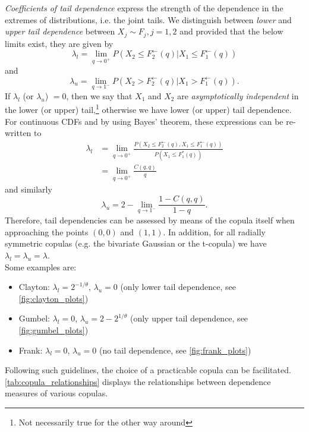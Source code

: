 
\textit{Coefficients of tail dependence} express the strength of the dependence in the extremes of distributions, i.e. the joint tails. We distinguish between \textit{lower} and \textit{upper tail dependence} between $X_j \sim F_j, j = 1,2$ and provided that the below limits exist, they are given by
\begin{equation}
\lambda_{l}=\lim \limits _ {q \rightarrow 0^+} P \left(X_{2} \leq F_{2}^{\leftarrow}(q) | X_{1} \leq F_{1}^{\leftarrow}(q)\right) 
\label{eq:lower_tail_dependence}
\end{equation}
and 
\begin{equation}
\lambda_{u}=\lim \limits _ {q \rightarrow 1^-} P \left(X_{2} > F_{2}^{\leftarrow}(q) | X_{1} > F_{1}^{\leftarrow}(q)\right).
\label{eq:upper_tail_dependence}
\end{equation}
If $\lambda_l$ (or $\lambda_u$) $=0$, then we say that $X_1$ and $X_2$ are \textit{asymptotically independent} in the lower (or upper) tail,\footnote{Not necessarily true for the other way around} otherwise we have lower (or upper) tail dependence.\\
For continuous \acp{CDF} and by using Bayes' theorem, these expressions can be re-written to
$$
\begin{aligned}
\lambda_{l} &=\lim _{q \rightarrow 0^+} \frac{P\left(X_{2} \leq F_{2}^{\leftarrow}(q), X_{1} \leq F_{1}^{\leftarrow}(q)\right)}{P\left(X_{1} \leq F_{1}^{*}(q)\right)} \\
&=\lim _{q \rightarrow 0^+} \frac{C(q, q)}{q}
\end{aligned}
$$
and similarly
$$
\lambda_u = 2-\lim _{q \rightarrow 1^-} \frac{1-C(q, q)}{1-q}.
$$
Therefore, tail dependencies can be assessed by means of the copula itself when approaching the points $(0,0)$ and $(1,1)$. In addition, for all radially symmetric copulas (e.g. the bivariate Gaussian or the t-copula) we have $\lambda_l = \lambda_u = \lambda$.\\
Some examples are:
\begin{itemize}
\item Clayton: $\lambda_l = 2^{-1/ \theta}$, $\lambda_u = 0$ (only lower tail dependence, see \autoref{fig:clayton_plots})
\item Gumbel: $\lambda_l = 0$, $\lambda_u = 2 - 2^{1/ \theta}$ (only upper tail dependence, see \autoref{fig:gumbel_plots})
\item Frank: $\lambda_l = 0$, $\lambda_u = 0$ (no tail dependence, see \autoref{fig:frank_plots})
\end{itemize}
Following such guidelines, the choice of a practicable copula can be facilitated. \autoref{tab:copula_relationships} displays the relationships between dependence measures of various copulas.\\



